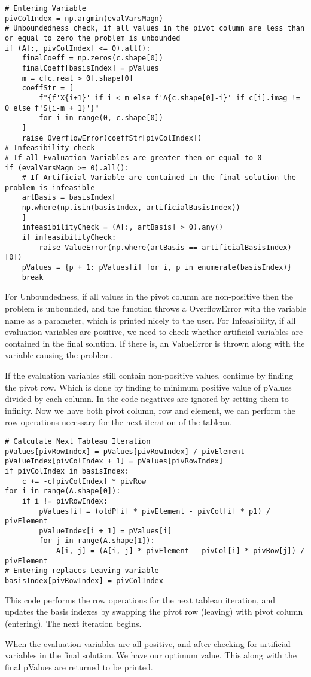 \documentclass[letterpaper, a4paper]{article}
\begin{document}
\begingroup
\fontsize{8}{10}\selectfont
\begin{verbatim}
# Entering Variable
pivColIndex = np.argmin(evalVarsMagn)
# Unboundedness check, if all values in the pivot column are less than or equal to zero the problem is unbounded
if (A[:, pivColIndex] <= 0).all():
    finalCoeff = np.zeros(c.shape[0])
    finalCoeff[basisIndex] = pValues
    m = c[c.real > 0].shape[0]
    coeffStr = [
        f"{f'X{i+1}' if i < m else f'A{c.shape[0]-i}' if c[i].imag != 0 else f'S{i-m + 1}'}"
        for i in range(0, c.shape[0])
    ]
    raise OverflowError(coeffStr[pivColIndex])
# Infeasibility check
# If all Evaluation Variables are greater then or equal to 0
if (evalVarsMagn >= 0).all():
    # If Artificial Variable are contained in the final solution the problem is infeasible
    artBasis = basisIndex[
    np.where(np.isin(basisIndex, artificialBasisIndex))
    ]
    infeasibilityCheck = (A[:, artBasis] > 0).any()
    if infeasibilityCheck:
        raise ValueError(np.where(artBasis == artificialBasisIndex)[0])
    pValues = {p + 1: pValues[i] for i, p in enumerate(basisIndex)}
    break
\end{verbatim}
\endgroup

For Unboundedness, if all values in the pivot column are non-positive then the problem is unbounded, and the function throws a OverflowError with the variable name as a parameter, which is printed nicely to the user.
For Infeasibility, if all evaluation variables are positive, we need to check whether artificial variables are contained in the final solution. If there is, an ValueError is thrown along with the variable causing the problem.

If the evaluation variables still contain non-positive values, continue by finding the pivot row. Which is done by finding to minimum positive value of pValues divided by each column. In the code negatives are ignored by setting them to infinity.
Now we have both pivot column, row and element, we can perform the row operations necessary for the next iteration of the tableau.

\begingroup
\fontsize{8}{10}\selectfont
\begin{verbatim}
# Calculate Next Tableau Iteration
pValues[pivRowIndex] = pValues[pivRowIndex] / pivElement
pValueIndex[pivColIndex + 1] = pValues[pivRowIndex]
if pivColIndex in basisIndex:
    c += -c[pivColIndex] * pivRow
for i in range(A.shape[0]):
    if i != pivRowIndex:
        pValues[i] = (oldP[i] * pivElement - pivCol[i] * p1) / pivElement
        pValueIndex[i + 1] = pValues[i]
        for j in range(A.shape[1]):
            A[i, j] = (A[i, j] * pivElement - pivCol[i] * pivRow[j]) / pivElement
# Entering replaces Leaving variable
basisIndex[pivRowIndex] = pivColIndex
\end{verbatim}
\endgroup
This code performs the row operations for the next tableau iteration, and updates the basis indexes by swapping the pivot row (leaving) with pivot column (entering). The next iteration begins.

When the evaluation variables are all positive, and after checking for artificial variables in the final solution. We have our optimum value. This along with the final pValues are returned to be printed.
\end{document}
